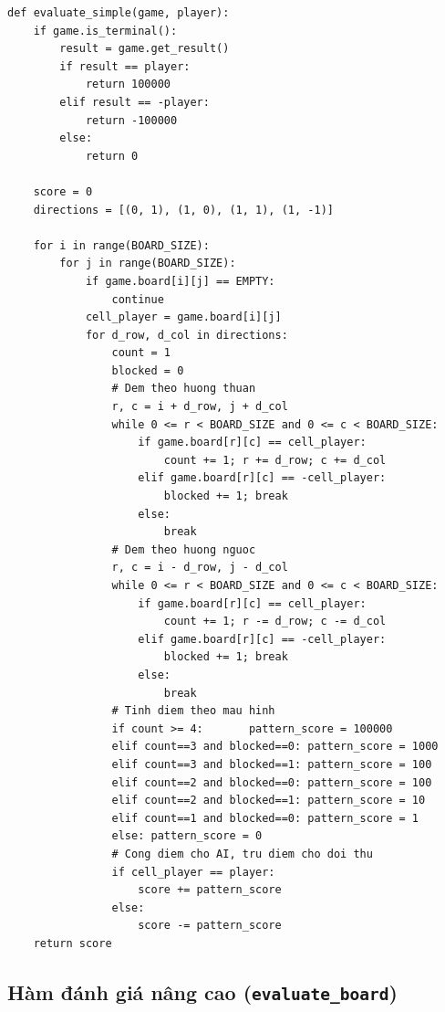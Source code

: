 \documentclass[12pt,a4paper]{article}
\begin{document}
\begin{lstlisting}[caption={Hàm đánh giá chính (\texttt{evaluation.py})}]
def evaluate_simple(game, player):
    if game.is_terminal():
        result = game.get_result()
        if result == player:
            return 100000
        elif result == -player:
            return -100000
        else:
            return 0

    score = 0
    directions = [(0, 1), (1, 0), (1, 1), (1, -1)]

    for i in range(BOARD_SIZE):
        for j in range(BOARD_SIZE):
            if game.board[i][j] == EMPTY:
                continue
            cell_player = game.board[i][j]
            for d_row, d_col in directions:
                count = 1
                blocked = 0
                # Dem theo huong thuan
                r, c = i + d_row, j + d_col
                while 0 <= r < BOARD_SIZE and 0 <= c < BOARD_SIZE:
                    if game.board[r][c] == cell_player:
                        count += 1; r += d_row; c += d_col
                    elif game.board[r][c] == -cell_player:
                        blocked += 1; break
                    else:
                        break
                # Dem theo huong nguoc
                r, c = i - d_row, j - d_col
                while 0 <= r < BOARD_SIZE and 0 <= c < BOARD_SIZE:
                    if game.board[r][c] == cell_player:
                        count += 1; r -= d_row; c -= d_col
                    elif game.board[r][c] == -cell_player:
                        blocked += 1; break
                    else:
                        break
                # Tinh diem theo mau hinh
                if count >= 4:       pattern_score = 100000
                elif count==3 and blocked==0: pattern_score = 1000
                elif count==3 and blocked==1: pattern_score = 100
                elif count==2 and blocked==0: pattern_score = 100
                elif count==2 and blocked==1: pattern_score = 10
                elif count==1 and blocked==0: pattern_score = 1
                else: pattern_score = 0
                # Cong diem cho AI, tru diem cho doi thu
                if cell_player == player:
                    score += pattern_score
                else:
                    score -= pattern_score
    return score
\end{lstlisting}

\subsection{Hàm đánh giá nâng cao (\texttt{evaluate\_board})}
\end{document}
